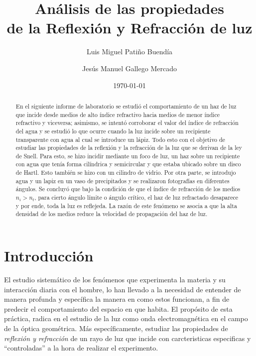 \documentclass[
aps,
reprint,
amsmath, amssymb,
superscriptaddress,
]{revtex4-2}
\begin{document}

\title{Análisis de las propiedades \\de la Reflexión y Refracción de luz}

\author{Luis Miguel Patiño Buendía}
\author{Jesús Manuel Gallego Mercado}




\date{\today}

\begin{abstract}
En el siguiente informe de laboratorio se estudió el comportamiento de un haz de luz que incide desde medios de alto índice refractivo hacia medios de menor índice refractivo y viceversa; asimismo, se intentó corroborar el valor del índice de refracción del agua y se estudió lo que ocurre cuando la luz incide sobre un recipiente transparente con agua al cual se introduce un lápiz. Todo esto con el objetivo de estudiar las propiedades de la reflexión y la refracción de la luz que se derivan de la ley de Snell. Para esto, se hizo incidir mediante un foco de luz, un haz sobre un recipiente con agua que tenía forma cilíndrica y semicircular y que estaba ubicado sobre un disco de Hartl. Esto también se hizo con un cilindro de vidrio. Por otra parte, se introdujo agua y un lapiz en un vaso de precipitados y se realizaron fotografías en diferentes ángulos. Se concluyó que bajo la condición de que el índice de refracción de los medios $n_i  > n_t$, para cierto ángulo límite o ángulo crítico, el haz de luz refractado desaparece y por ende, toda la luz es reflejeda. La razón de este fenómeno se asocia a que la alta densidad de los medios reduce la velocidad de propagación del haz de luz.
\end{abstract}


\maketitle
\section{Introducción}
El estudio sistemático de los fenómenos que experimenta la materia y su interacción diaria con el hombre, lo han llevado a la necesidad de entender de manera profunda y específica la manera en como estos funcionan, a fin de predecir el comportamiento del espacio en que habita. El propósito de esta práctica, radica en el estudio de la luz como onda electromagnética en el campo de la óptica geométrica. Más específicamente, estudiar las propiedades de \textit{reflexión y refracción} de un rayo de luz que incide con carcteristicas especificas y ``controladas'' a la hora de realizar el experimento.
\end{document}
